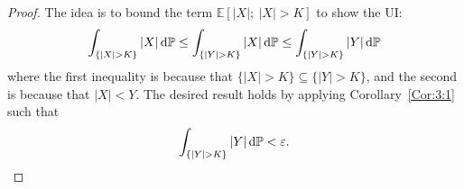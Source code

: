 \begin{proof}
The idea is to bound the term $\mathbb{E}[|X|;~|X|>K]$ to show the UI:
\[
\int_{\{|X|>K\}}|X|\diff\mathbb{P}\le
\int_{\{|Y|>K\}}|X|\diff\mathbb{P}\le
\int_{\{|Y|>K\}}|Y|\diff\mathbb{P}
\]
where the first inequality is because that $\{|X|>K\}\subseteq\{|Y|>K\}$, and the second is because that $|X|<Y$.
The desired result holds by applying Corollary~\ref{Cor:3:1} such that 
\[
\int_{\{|Y|>K\}}|Y|\diff\mathbb{P}<\varepsilon.
\]
\end{proof}











